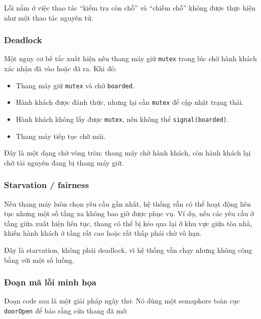 Lỗi nằm ở việc thao tác ``kiểm tra còn chỗ'' và ``chiếm chỗ'' không được
thực hiện như một thao tác nguyên tử.

\subsubsection*{Deadlock}

Một nguy cơ bế tắc xuất hiện nếu thang máy giữ \texttt{mutex} trong lúc
chờ hành khách xác nhận đã vào hoặc đã ra. Khi đó:

\begin{itemize}
    \item Thang máy giữ \texttt{mutex} và chờ \texttt{boarded}.
    \item Hành khách được đánh thức, nhưng lại cần \texttt{mutex} để cập
    nhật trạng thái.
    \item Hành khách không lấy được \texttt{mutex}, nên không thể
    \texttt{signal(boarded)}.
    \item Thang máy tiếp tục chờ mãi.
\end{itemize}

Đây là một dạng chờ vòng tròn: thang máy chờ hành khách, còn hành khách
lại chờ tài nguyên đang bị thang máy giữ.

\subsubsection*{Starvation / fairness}

Nếu thang máy luôn chọn yêu cầu gần nhất, hệ thống vẫn có thể hoạt động
liên tục nhưng một số tầng xa không bao giờ được phục vụ. Ví dụ, nếu các
yêu cầu ở tầng giữa xuất hiện liên tục, thang có thể bị kéo qua lại ở
khu vực giữa tòa nhà, khiến hành khách ở tầng rất cao hoặc rất thấp phải
chờ vô hạn.

Đây là starvation, không phải deadlock, vì hệ thống vẫn chạy nhưng không
công bằng với một số luồng.

\subsubsection*{Đoạn mã lỗi minh họa}

Đoạn code sau là một giải pháp ngây thơ. Nó dùng một semaphore toàn cục
\texttt{doorOpen} để báo rằng cửa thang đã mở:

